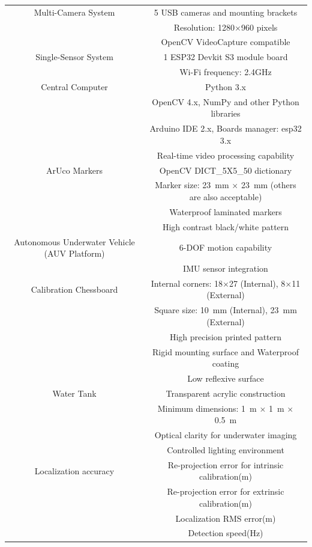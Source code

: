 \documentclass[11pt]{article}
\begin{document}
\begin{longtable}[c]{| c | c |}
                Multi-Camera System 
                & 5 USB cameras and mounting brackets\\
                & Resolution: 1280$\times$960 pixels \\
                & OpenCV VideoCapture compatible \\
                \hline
                Single-Sensor System 
                & 1 ESP32 Devkit S3 module board\\
                & Wi-Fi frequency: 2.4GHz \\
                \hline
                Central Computer 
                & Python 3.x   \\
                & OpenCV 4.x, NumPy and other Python libraries \\
                & Arduino IDE 2.x, Boards manager: esp32 3.x \\
                & Real-time video processing capability \\
                \hline
                ArUco Markers 
                & OpenCV DICT\_5X5\_50 dictionary \\
                & Marker size: 23~mm $\times$ 23~mm (others are also acceptable) \\
                & Waterproof laminated markers \\
                & High contrast black/white pattern \\
                \hline
                Autonomous Underwater Vehicle (AUV Platform)
                & 6-DOF motion capability \\
                & IMU sensor integration \\
                \hline
                Calibration Chessboard
                & Internal corners: 18$\times$27 (Internal), 8$\times$11 (External)\\
                & Square size: 10~mm (Internal), 23~mm (External)  \\
                & High precision printed pattern \\
                & Rigid mounting surface and  Waterproof coating\\
                & Low reflexive surface\\
                \hline
                Water Tank 
                & Transparent acrylic construction \\
                & Minimum dimensions: 1~m $\times$ 1~m $\times$ 0.5~m \\
                & Optical clarity for underwater imaging \\
                & Controlled lighting environment \\
                \hline
                Localization accuracy 
                & Re-projection error for intrinsic calibration(m) \\
                & Re-projection error for extrinsic calibration(m) \\
                & Localization RMS error(m) \\
                & Detection speed(Hz) \\
                \hline
            \end{longtable}
\end{document}
